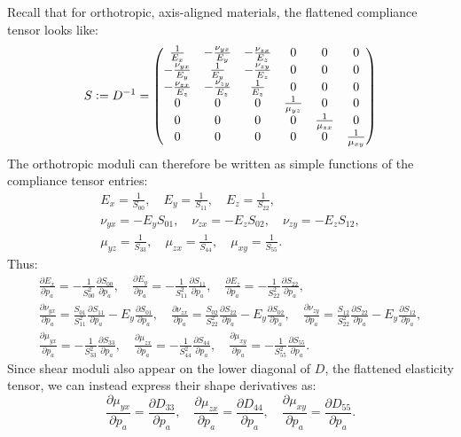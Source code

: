 \documentclass[10pt]{article}
\providecommand{\pder}[2]{\frac{\partial #1}{\partial #2}}
\newcommand{\defeq}{\vcentcolon=}
\begin{document}
Recall that for orthotropic, axis-aligned materials, the flattened compliance
tensor looks like:
$$
S \defeq D^{-1} = \begin{pmatrix}
    \frac{1}{E_x} & -\frac{\nu_{yx}}{E_y} & -\frac{\nu_{zx}}{E_z} & 0 & 0 & 0 \\
    -\frac{\nu_{yx}}{E_y} & \frac{1}{E_y} & -\frac{\nu_{zy}}{E_z} & 0 & 0 & 0 \\
    -\frac{\nu_{zx}}{E_z} & -\frac{\nu_{zy}}{E_z} & \frac{1}{E_z} & 0 & 0 & 0 \\
    0 & 0 & 0 & \frac{1}{\mu_{yz}} & 0 & 0 \\
    0 & 0 & 0 & 0 & \frac{1}{\mu_{zx}} & 0 \\
    0 & 0 & 0 & 0 & 0 & \frac{1}{\mu_{xy}}
\end{pmatrix}
$$
The orthotropic moduli can therefore be written as simple functions of the
compliance tensor entries:
\begin{gather*}
E_x = \frac{1}{S_{00}}, \quad
E_y = \frac{1}{S_{11}}, \quad
E_z = \frac{1}{S_{22}}, \\
\nu_{yx} = -E_y S_{01}, \quad
\nu_{zx} = -E_z S_{02}, \quad
\nu_{zy} = -E_z S_{12}, \\
\mu_{yz} = \frac{1}{S_{33}}, \quad
\mu_{zx} = \frac{1}{S_{44}}, \quad
\mu_{xy} = \frac{1}{S_{55}}.
\end{gather*}
Thus:
\begin{gather*}
    \pder{E_x}{p_a} = -\frac{1}{S_{00}^2} \pder{S_{00}}{p_a}, \quad
    \pder{E_y}{p_a} = -\frac{1}{S_{11}^2} \pder{S_{11}}{p_a}, \quad
    \pder{E_z}{p_a} = -\frac{1}{S_{22}^2} \pder{S_{22}}{p_a}, \\
    \pder{\nu_{yx}}{p_a} = \frac{S_{01}}{S_{11}^2} \pder{S_{11}}{p_a} - E_y \pder{S_{01}}{p_a}, \quad
    \pder{\nu_{zx}}{p_a} = \frac{S_{02}}{S_{22}^2} \pder{S_{22}}{p_a} - E_y \pder{S_{02}}{p_a}, \quad
    \pder{\nu_{zy}}{p_a} = \frac{S_{12}}{S_{22}^2} \pder{S_{22}}{p_a} - E_y \pder{S_{12}}{p_a}, \\
    \pder{\mu_{yx}}{p_a} = -\frac{1}{S_{33}^2} \pder{S_{33}}{p_a}, \quad
    \pder{\mu_{zx}}{p_a} = -\frac{1}{S_{44}^2} \pder{S_{44}}{p_a}, \quad
    \pder{\mu_{xy}}{p_a} = -\frac{1}{S_{55}^2} \pder{S_{55}}{p_a}.
\end{gather*}
Since shear moduli also appear on the lower diagonal of $D$, the flattened
elasticity tensor, we can instead express their shape derivatives as:
$$
    \pder{\mu_{yx}}{p_a} = \pder{D_{33}}{p_a}, \quad
    \pder{\mu_{zx}}{p_a} = \pder{D_{44}}{p_a}, \quad
    \pder{\mu_{xy}}{p_a} = \pder{D_{55}}{p_a}.
$$
\end{document}
